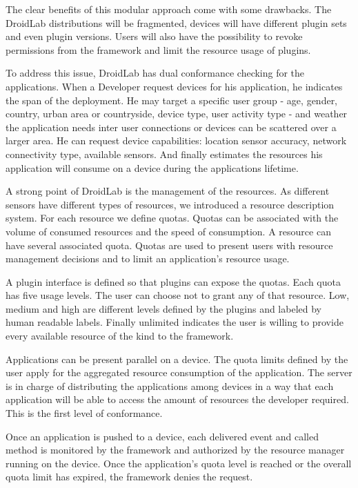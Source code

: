 \documentclass[conference,letterpaper]{IEEEtran}
\begin{document}
The clear benefits of this modular approach come with some drawbacks. The DroidLab distributions will be fragmented, devices will have different plugin sets and even plugin versions. Users will also have the possibility to revoke permissions from the framework and limit the resource usage of plugins.

To address this issue, DroidLab has dual conformance checking for the applications. When a Developer request devices for his application, he indicates the span of the deployment. He may target a specific user group - age, gender, country, urban area or countryside, device type, user activity type - and weather the application needs inter user connections or devices can be scattered over a larger area. He can request device capabilities: location sensor accuracy, network connectivity type, available sensors. And finally estimates the resources his application will consume on a device during the applications lifetime.

A strong point of DroidLab is the management of the resources. As different sensors have different types of resources, we introduced a resource description system. For each resource we define quotas. Quotas can be associated with the volume of consumed resources and the speed of consumption. A resource can have several associated quota. Quotas are used to present users with resource management decisions and to limit an application's resource usage.

A plugin interface is defined so that plugins can expose the quotas. Each quota has five usage levels. The user can choose not to grant any of that resource. Low, medium and high are different levels defined by the plugins and labeled by human readable labels. Finally unlimited indicates the user is willing to provide every available resource of the kind to the framework.

Applications can be present parallel on a device. The quota limits defined by the user apply for the aggregated resource consumption of the application. The server is in charge of distributing the applications among devices in a way that each application will be able to access the amount of resources the developer required. This is the first level of conformance.

Once an application is pushed to a device, each delivered event and called method is monitored by the framework and authorized by the resource manager running on the device. Once the application's quota level is reached or the overall quota limit has expired, the framework denies the request.
\end{document}
